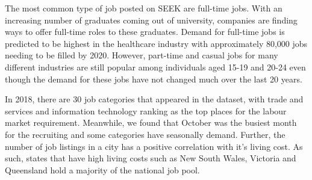 \documentclass[11pt,a4paper,]{article}
\begin{document}
The most common type of job posted on SEEK are full-time jobs. With an increasing number of graduates coming out of university, companies are finding ways to offer full-time roles to these graduates. Demand for full-time jobs is predicted to be highest in the healthcare industry with approximately 80,000 jobs needing to be filled by 2020. However, part-time and casual jobs for many different industries are still popular among individuals aged 15-19 and 20-24 even though the demand for these jobs have not changed much over the last 20 years.

In 2018, there are 30 job categories that appeared in the dataset, with trade and services and information technology ranking as the top places for the labour market requirement. Meanwhile, we found that October was the busiest month for the recruiting and some categories have seasonally demand. Further, the number of job listings in a city has a positive correlation with it's living cost. As such, states that have high living costs such as New South Wales, Victoria and Queensland hold a majority of the national job pool.

\printbibliography
\end{document}
